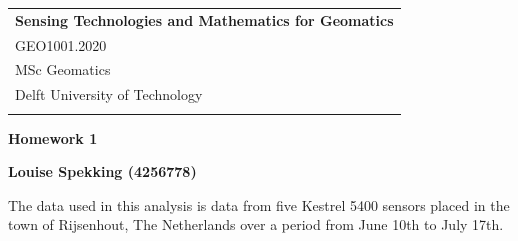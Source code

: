 \documentclass[a4paper,12pt]{article} %
\begin{document}



\thispagestyle{empty} %

\begin{tabular}{p{15.5cm}} %
{\large \bf Sensing Technologies and Mathematics for Geomatics} \\
GEO1001.2020 \\ MSc Geomatics \\ Delft University of Technology \\
\hline %
\\
\end{tabular} %

\vspace*{0.3cm} %

\begin{center} %
	{\Large \bf Homework 1} %
	\vspace{2mm}
	
	{\bf Louise Spekking (4256778)} %
		
\end{center}  

\vspace{0.4cm}


The data used in this analysis is data from five Kestrel 5400 sensors placed in the town of Rijsenhout, The Netherlands over a period from June 10th to July 17th.  \cite{data}
\end{document}
